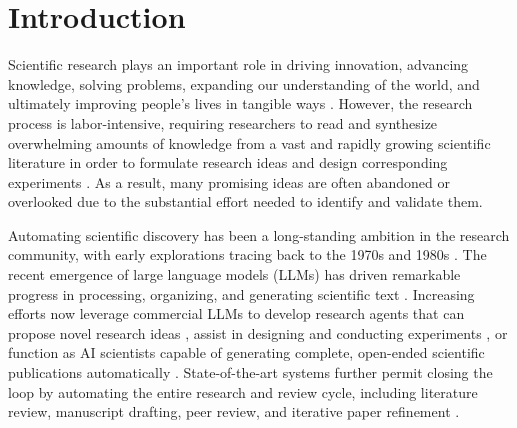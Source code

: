 \documentclass[manuscript,review,anonymous]{acmart}
\begin{document}

\maketitle

\section{Introduction}
Scientific research plays an important role in driving innovation, advancing knowledge, solving problems, expanding our understanding of the world, and ultimately improving people's lives in tangible ways \cite{wang2023scientific}. However, the research process is labor-intensive, requiring researchers to read and synthesize overwhelming amounts of knowledge from a vast and rapidly growing scientific literature in order to formulate research ideas and design corresponding experiments \cite{hope2023computational}. As a result, many promising ideas are often abandoned or overlooked due to the substantial effort needed to identify and validate them.

Automating scientific discovery has been a long-standing ambition in the research community, with early explorations tracing back to the 1970s and 1980s \cite{langley1987scientific}. The recent emergence of large language models (LLMs) \cite{achiam2023gpt} has driven remarkable progress in processing, organizing, and generating scientific text \cite{wang2023scientific}. Increasing efforts now leverage commercial LLMs to develop research agents that can propose novel research ideas \cite{wang2023scimon,yang2024large,baek2025researchagent}, assist in designing and conducting experiments \cite{du2024llms}, or function as AI scientists capable of generating complete, open-ended scientific publications automatically \cite{lu2024ai,yamada2025ai}. State-of-the-art systems further permit closing the loop by automating the entire research and review cycle, including literature review, manuscript drafting, peer review, and iterative paper refinement \cite{weng2025cycleresearcher}.
\end{document}
